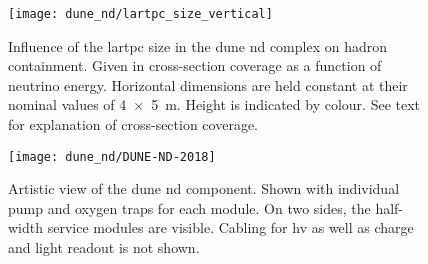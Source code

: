 \begin{figure}[htb]
	\centering
	\texttt{[image: dune\_nd/lartpc\_size\_vertical]}
	\caption[\AC{}   hadron containment]{
		Influence of the \acrshort{lartpc} size in the \acrshort{dune} \acrshort{nd} complex on hadron containment.
		Given in cross-section coverage as a function of neutrino energy.
		Horizontal dimensions are held constant at their nominal values of \SI{4 x 5}{\metre}.
		Height is indicated by colour.
		See text for explanation of cross-section coverage.
	}
	\label{fig:dune-nd_lartpc-size}
\end{figure}

\begin{figure}[htb]
	\centering
	\texttt{[image: dune\_nd/DUNE-ND-2018]}
	\caption[\AC{}   artistic view]{
		Artistic view of the \acrshort{dune} \acrshort{nd} \AC{} component.
		Shown with individual pump and oxygen traps for each module.
		On two sides, the half-width service modules are visible.
		Cabling for \acrshort{hv} as well as charge and light readout is not shown.
	}
	\label{fig:dune-nd_ac}
\end{figure}

